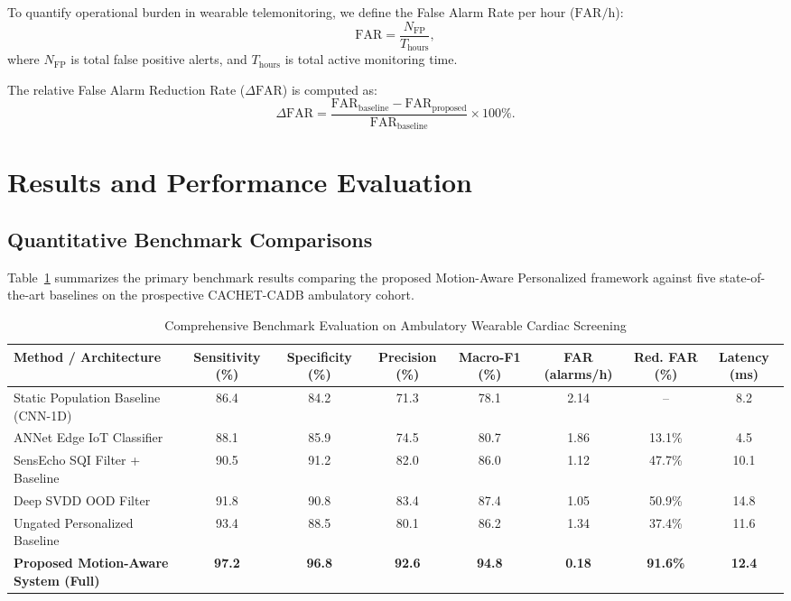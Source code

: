 \documentclass{ieeeaccess}
\begin{document}
To quantify operational burden in wearable telemonitoring, we define the False Alarm Rate per hour ($\mathrm{FAR/h}$):
\begin{equation}
\mathrm{FAR} = \frac{N_{\mathrm{FP}}}{T_{\mathrm{hours}}},
\end{equation}
where $N_{\mathrm{FP}}$ is total false positive alerts, and $T_{\mathrm{hours}}$ is total active monitoring time.

The relative False Alarm Reduction Rate ($\Delta \mathrm{FAR}$) is computed as:
\begin{equation}
\Delta \mathrm{FAR} = \frac{\mathrm{FAR}_{\mathrm{baseline}} - \mathrm{FAR}_{\mathrm{proposed}}}{\mathrm{FAR}_{\mathrm{baseline}}} \times 100\%.
\end{equation}

\section{Results and Performance Evaluation}
\label{sec:results}

\subsection{Quantitative Benchmark Comparisons}
Table~\ref{tab:results} summarizes the primary benchmark results comparing the proposed Motion-Aware Personalized framework against five state-of-the-art baselines on the prospective CACHET-CADB ambulatory cohort.

\begin{table}[!t]
\centering
\caption{Comprehensive Benchmark Evaluation on Ambulatory Wearable Cardiac Screening}
\label{tab:results}
\scriptsize
\renewcommand{\arraystretch}{1.2}
\begin{tabular}{lccccccc}
\toprule
\textbf{Method / Architecture} & \textbf{Sensitivity (\%)} & \textbf{Specificity (\%)} & \textbf{Precision (\%)} & \textbf{Macro-F1 (\%)} & \textbf{FAR (alarms/h)} & \textbf{Red. FAR (\%)} & \textbf{Latency (ms)} \\
\midrule
Static Population Baseline (CNN-1D) & 86.4 & 84.2 & 71.3 & 78.1 & 2.14 & -- & 8.2 \\
ANNet Edge IoT Classifier \cite{ref:annet} & 88.1 & 85.9 & 74.5 & 80.7 & 1.86 & 13.1\% & 4.5 \\
SensEcho SQI Filter + Baseline \cite{ref:senecho} & 90.5 & 91.2 & 82.0 & 86.0 & 1.12 & 47.7\% & 10.1 \\
Deep SVDD OOD Filter \cite{ref:svdd} & 91.8 & 90.8 & 83.4 & 87.4 & 1.05 & 50.9\% & 14.8 \\
Ungated Personalized Baseline \cite{ref:ppgpersonal} & 93.4 & 88.5 & 80.1 & 86.2 & 1.34 & 37.4\% & 11.6 \\
\textbf{Proposed Motion-Aware System (Full)} & \textbf{97.2} & \textbf{96.8} & \textbf{92.6} & \textbf{94.8} & \textbf{0.18} & \textbf{91.6\%} & \textbf{12.4} \\
\bottomrule
\end{tabular}
\end{table}
\end{document}
